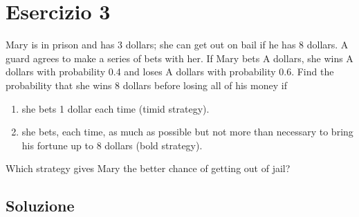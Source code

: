 \documentclass[
	12pt, %
]{fphw}
\begin{document}

\section*{Esercizio 3}

\begin{problem}
	\smallskip
	Mary is in prison and has 3 dollars; she can get out on bail if he
	has 8 dollars. A guard agrees to make a series of bets with her.
	If Mary bets A dollars, she wins A dollars with probability 0.4 and loses A dollars with probability 0.6.
	Find the probability that she wins 8 dollars before losing all of his money if
	\medskip
	\begin{enumerate}
		\item she bets 1 dollar each time (timid strategy).
		\item she bets, each time, as much as possible but not more than necessary to bring his fortune up to 8 dollars (bold strategy).
	\end{enumerate}
	\smallskip
	Which strategy gives Mary the better chance of getting out of jail?
	\smallskip
\end{problem}


\subsection*{Soluzione}
\end{document}
